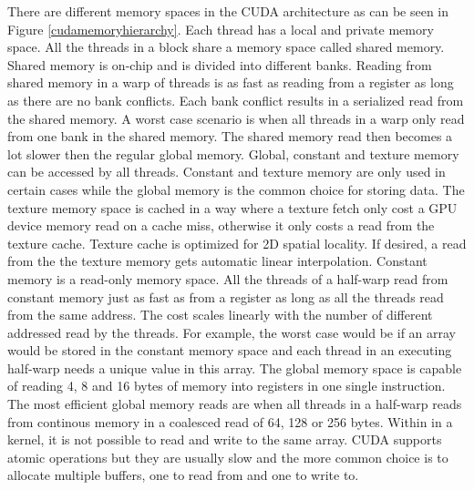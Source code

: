 There are different memory spaces in the CUDA architecture as can be seen in Figure \ref{cudamemoryhierarchy}. Each thread has a local and private memory space. All the threads in a block share a memory space called shared memory. Shared memory is on-chip and is divided into different banks. Reading from shared memory in a warp of threads is as fast as reading from a register as long as there are no bank conflicts. Each bank conflict results in a serialized read from the shared memory. A worst case scenario is when all threads in a warp only read from one bank in the shared memory. The shared memory read then becomes a lot slower then the regular global memory. Global, constant and texture memory can be accessed by all threads. Constant and texture memory are only used in certain cases while the global memory is the common choice for storing data. The texture memory space is cached in a way where a texture fetch only cost a GPU device memory read on a cache miss, otherwise it only costs a read from the texture cache. Texture cache is optimized for 2D spatial locality. If desired, a read from the the texture memory gets automatic linear interpolation. Constant memory is a read-only memory space. All the threads of a half-warp read from constant memory just as fast as from a register as long as all the threads read from the same address. The cost scales linearly with the number of different addressed read by the threads. For example, the worst case would be if an array would be stored in the constant memory space and each thread in an executing half-warp needs a unique value in this array. The global memory space is capable of reading 4, 8 and 16 bytes of memory into registers in one single instruction. The most efficient global memory reads are when all threads in a half-warp reads from continous memory in a coalesced read of 64, 128 or 256 bytes. Within in a kernel, it is not possible to read and write to the same array. CUDA supports atomic operations but they are usually slow and the more common choice is to allocate multiple buffers, one to read from and one to write to.



